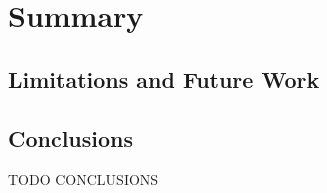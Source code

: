 \chapter{Summary}
\label{chp:summary}

\section{Limitations and Future Work}




\section{Conclusions}
TODO CONCLUSIONS